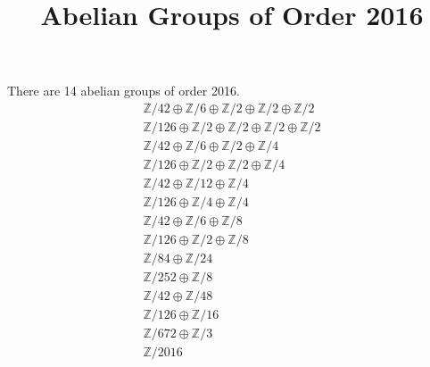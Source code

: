 \documentclass{amsart}
\title{Abelian Groups of Order 2016}
\newcommand{\Z}{\mathbb Z}
\begin{document}
\maketitle
There are 14 abelian groups of order 2016.
\begin{gather*}
\Z/42\oplus\Z/6\oplus\Z/2\oplus\Z/2\oplus\Z/2\\
\Z/126\oplus\Z/2\oplus\Z/2\oplus\Z/2\oplus\Z/2\\
\Z/42\oplus\Z/6\oplus\Z/2\oplus\Z/4\\
\Z/126\oplus\Z/2\oplus\Z/2\oplus\Z/4\\
\Z/42\oplus\Z/12\oplus\Z/4\\
\Z/126\oplus\Z/4\oplus\Z/4\\
\Z/42\oplus\Z/6\oplus\Z/8\\
\Z/126\oplus\Z/2\oplus\Z/8\\
\Z/84\oplus\Z/24\\
\Z/252\oplus\Z/8\\
\Z/42\oplus\Z/48\\
\Z/126\oplus\Z/16\\
\Z/672\oplus\Z/3\\
\Z/2016
\end{gather*}
\end{document}
